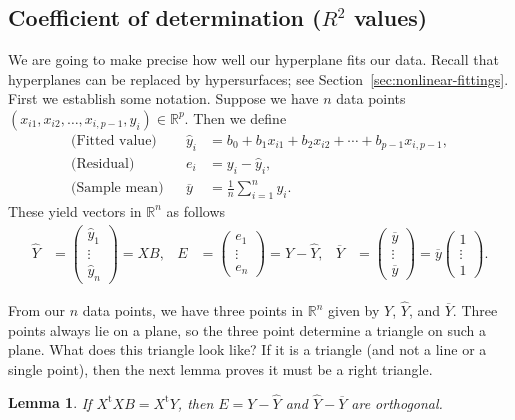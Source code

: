 \documentclass[a4paper, 12pt]{article}
\numberwithin{equation}{section}
\numberwithin{figure}{section}
\newtheorem{lem}[thm]{Lemma}
\theoremstyle{definition}
\newcommand{\R}{\mathbb{R}}
\newcommand{\tr}{\mathrm{t}}
\newcommand{\WEEK}[1]{%
\hfill Week #1

\vspace{-1em}

\begin{center}
	\rule{\textwidth}{2pt}
\end{center}
\vspace{0.5em}%
}
\begin{document}

\subsection{Coefficient of determination ($R^2$ values)}

We are going to make precise how well our hyperplane fits our data. Recall that
hyperplanes can be replaced by hypersurfaces; see Section~\ref{sec:nonlinear-fittings}.
First we establish some notation. Suppose we have $n$ data points $(x_{i1},
x_{i2}, \dots, x_{i,p-1}, y_i)\in \R^p$. Then we define  
\begin{align*}
	\text{(Fitted value)} & & \widehat{y}_i &= b_0 + b_1x_{i1} + b_2 x_{i2} + \cdots + b_{p-1} x_{i,p-1}, \\
	\text{(Residual)} & & e_i &= y_i - \widehat{y}_i, \\
	\text{(Sample mean)} & & \overline{y} &= \frac{1}{n}\sum_{i=1}^n y_i.
\end{align*}
These yield vectors in $\R^n$ as follows 
\begin{align*}
	\widehat{Y} &= \begin{pmatrix}
		\widehat{y}_1 \\ \vdots \\ \widehat{y}_n
	\end{pmatrix} = XB, & 
	E &= \begin{pmatrix}
		e_1 \\ \vdots \\ e_n
	\end{pmatrix} = Y - \widehat{Y}, & 
	\overline{Y} &= \begin{pmatrix}
		\overline{y} \\ \vdots \\ \overline{y}
	\end{pmatrix} = \overline{y} \begin{pmatrix}
		1 \\ \vdots \\ 1 
	\end{pmatrix}. 
\end{align*}

From our $n$ data points, we have three points in $\R^n$ given by $Y$,
$\widehat{Y}$, and $\overline{Y}$. Three points always lie on a plane, so the
three point determine a triangle on such a plane. What does this triangle look
like? If it is a triangle (and not a line or a single point), then the next
lemma proves it must be a right triangle.

\begin{lem}\label{lem:orthog}
	If $X^{\tr}XB = X^{\tr}Y$, then $E = Y - \widehat{Y}$ and $\widehat{Y}-\overline{Y}$ are
	orthogonal.
\end{lem}
\end{document}
